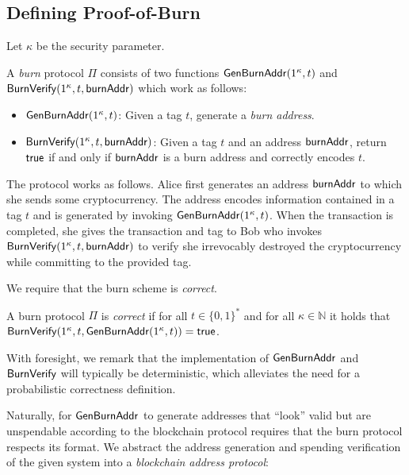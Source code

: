 \subsection{Defining Proof-of-Burn}

Let $\kappa$ be the security parameter.

\begin{definition}
  A \emph{burn} protocol $\Pi$ consists of two functions $\mathsf{Gen}\-\mathsf{Burn}\-\mathsf{Addr}(1^\kappa, t)$ and $\mathsf{Burn}\-\mathsf{Verify}(1^\kappa, t, \mathsf{burnAddr})$ which work as follows:

  \begin{itemize}
    \item $\mathsf{Gen}\-\mathsf{Burn}\-\mathsf{Addr}(1^\kappa, t)$: Given a tag $t$, generate a \emph{burn address}.

    \item $\mathsf{Burn}\-\mathsf{Verify}(1^\kappa, t, \mathsf{burnAddr})$: Given a tag $t$ and an address $\mathsf{burnAddr}$, return $\sf{true}$ if and only if $\mathsf{burnAddr}$ is a burn address and correctly encodes $t$.
  \end{itemize}
\end{definition}

The protocol works as follows. Alice first generates an address $\mathsf{burnAddr}$ to which she sends some cryptocurrency. The address encodes information contained in a tag $t$ and is generated by invoking $\mathsf{Gen}\-\mathsf{Burn}\-\mathsf{Addr}(1^\kappa, t)$. When the transaction is completed, she gives the transaction and tag to Bob who invokes $\mathsf{Burn}\-\mathsf{Verify}(1^\kappa,\allowbreak t,\allowbreak \mathsf{burnAddr})$ to verify she irrevocably destroyed the cryptocurrency while committing to the provided tag.

We require that the burn scheme is \emph{correct}.

\begin{definition}[Correctness]
  A burn protocol $\Pi$ is \emph{correct} if for all $t \in \{0,1\}^*$ and for all $\kappa \in \mathbb{N}$ it holds that
  $\mathsf{Burn}\-\mathsf{Verify}(1^\kappa, t, \mathsf{Gen}\-\mathsf{Burn}\-\mathsf{Addr}(1^\kappa, t)) = \textsf{true}$.
\end{definition}

With foresight, we remark that the implementation of $\mathsf{Gen}\-\mathsf{Burn}\-\mathsf{Addr}$ and $\mathsf{Burn}\-\mathsf{Verify}$ will typically be deterministic, which alleviates the need for a probabilistic correctness definition.

Naturally, for $\mathsf{Gen}\-\mathsf{Burn}\-\mathsf{Addr}$ to generate addresses that ``look'' valid but are unspendable according to the blockchain protocol requires that the burn protocol respects its format. We abstract the address generation and spending verification of the given system into a \emph{blockchain address protocol}:

